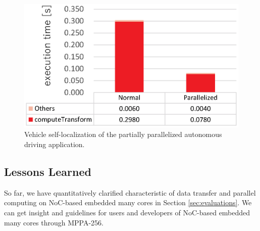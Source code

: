 \documentclass[conference,compsoc]{IEEEtran}
\newcommand{\comment}[1]{}
\begin{document}

\begin{figure}[t]
  \centering
  \includegraphics[width=0.9\linewidth]{../figure/BarGraph_ndt_matching.eps}
  \vspace{-4mm}
  \caption{\label{fig:ndt_matching}
  Vehicle self-localization of the partially parallelized autonomous driving application.}
  \vspace{-5mm}
\end{figure}

\vspace{-3mm}
\subsection{Lessons Learned}
\label{sec:lessons}
\vspace{-3mm}
\comment{TBD: 3-4}
So far, we have quantitatively clarified characteristic of data transfer and parallel computing on NoC-based embedded many cores in Section \ref{sec:evaluations}.
We can get insight and guidelines for users and developers of NoC-based embedded many cores through MPPA-256.
\end{document}
